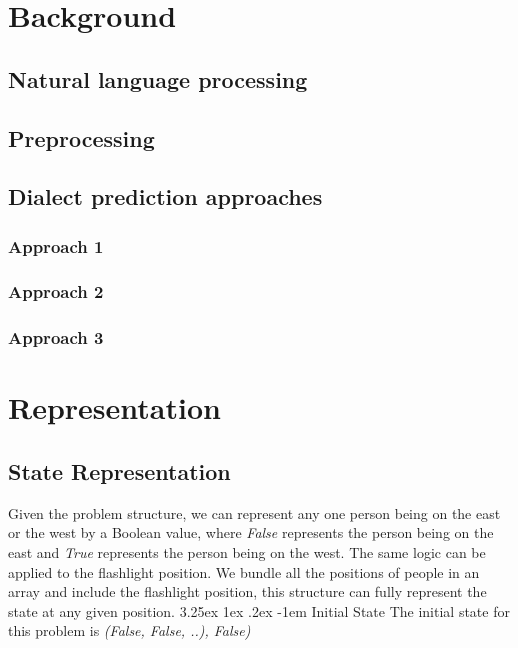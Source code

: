 \documentclass[12pt]{diazessay}
\makeatletter
\renewcommand\paragraph{\@startsection{paragraph}{5}{\z@}%
  {3.25ex \@plus1ex \@minus.2ex}%
  {-1em}%
  {\normalfont\normalsize\bfseries}}
\makeatother
\begin{document}
\section{Background}

    \subsection{Natural language processing}
    
    \subsection{Preprocessing}

    \subsection{Dialect prediction approaches}
    
        \subsubsection{Approach 1}
        \subsubsection{Approach 2}
        \subsubsection{Approach 3}


\section{Representation}
    \subsection{State Representation}
        Given the problem structure, we can represent any one person being on the east or the west by a Boolean value, where \textit{False} represents the person being on the east and \textit{True} represents the person being on the west. The same logic can be applied to the flashlight position. We bundle all the positions of people in an array and include the flashlight position, this structure can fully represent the state at any given position.
        \paragraph{Initial State}
            The initial state for this problem is \textit{(False, False, ..), False)}
\end{document}

